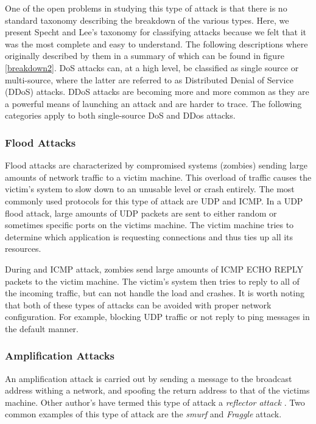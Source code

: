 \documentclass{acm_proc_article-sp}
\begin{document}
    	One of the open problems in studying this type of attack is that there is no standard taxonomy describing the breakdown of the various types. Here, we present Specht and Lee's taxonomy for classifying attacks because we felt that it was the most complete and easy to understand. The following descriptions where originally described by them in \cite{Specht2004} a summary of which can be found in figure \ref{breakdown2}. DoS attacks can, at a high level, be classified as single source or multi-source, where the latter are referred to as Distributed Denial of Service (DDoS) attacks. DDoS attacks are becoming more and more common as they are a powerful means of launching an attack and are harder to trace. The following categories apply to both single-source DoS and DDos attacks.
    		\subsubsection{Flood Attacks}
    		Flood attacks are characterized by compromised systems (zombies) sending large amounts of network traffic to a victim machine. This overload of traffic causes the victim's system to slow down to an unusable level or crash entirely. The most commonly used protocols for this type of attack are UDP and ICMP. In a UDP flood attack, large amounts of UDP packets are sent to either random or sometimes specific ports on the victims machine. The victim machine tries to determine which application is requesting connections and thus ties up all its resources. 
    		
    		During and ICMP attack, zombies send large amounts of ICMP ECHO REPLY packets to the victim machine. The victim's system then tries to reply to all of the incoming traffic, but can not handle the load and crashes. It is worth noting that both of these types of attacks can be avoided with proper network configuration. For example, blocking UDP traffic or not reply to ping messages in the default manner.
    		\subsubsection{Amplification Attacks}
    		An amplification attack is carried out by sending a message to the broadcast address withing a network, and spoofing the return address to that of the victims machine. Other author's have termed this type of attack a \emph{reflector attack} \cite{Hussain2003}. Two common examples of this type of attack are the \emph{smurf} and \emph{Fraggle} attack. 
    		
\end{document}
